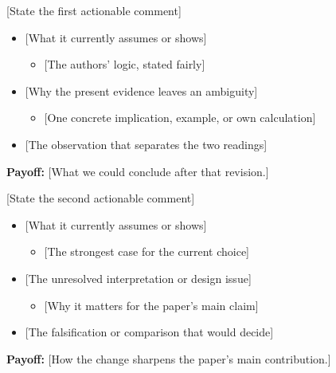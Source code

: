 \documentclass[11pt, aspectratio=169]{beamer}
\begin{document}
\begin{frame}[t]{[State the first actionable comment]}
  \medskip
  \begin{itemize}
    \item {} [What it currently assumes or shows]  %
      \begin{itemize}\item {[The authors' logic, stated fairly]}\end{itemize}
    \item {} [Why the present evidence leaves an ambiguity]
      \begin{itemize}\item {[One concrete implication, example, or own calculation]}\end{itemize}
    \item {} [The observation that separates the two readings]
  \end{itemize}
  \begin{ResultBox}
  \end{ResultBox}
  \smallskip
  \textbf{Payoff:} [What we could conclude after that revision.]
\end{frame}

\begin{frame}[t]{[State the second actionable comment]}
  \medskip
  \begin{itemize}
    \item {} [What it currently assumes or shows]
      \begin{itemize}\item {[The strongest case for the current choice]}\end{itemize}
    \item {} [The unresolved interpretation or design issue]
      \begin{itemize}\item {[Why it matters for the paper's main claim]}\end{itemize}
    \item {} [The falsification or comparison that would decide]
  \end{itemize}
  \begin{ResultBox}
  \end{ResultBox}
  \smallskip
  \textbf{Payoff:} [How the change sharpens the paper's main contribution.]
\end{frame}
\end{document}
